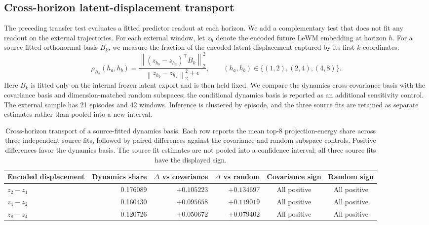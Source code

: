 \documentclass{article}
\begin{document}
\subsection{Cross-horizon latent-displacement transport}
\label{sec:supp-cross-horizon-transport}

The preceding transfer test evaluates a fitted predictor readout at each
horizon. We add a complementary test that does not fit any readout on the
external trajectories. For each external window, let $z_{h}$ denote the
encoded future LeWM embedding at horizon $h$. For a source-fitted orthonormal
basis $B_{k}$, we measure the fraction of the encoded latent displacement
captured by its first $k$ coordinates:
\begin{equation}
\rho_{B_k}(h_a,h_b)=
\frac{\left\lVert (z_{h_b}-z_{h_a})^{\top}B_k\right\rVert_2^2}
{\left\lVert z_{h_b}-z_{h_a}\right\rVert_2^2+\epsilon},
\qquad (h_a,h_b)\in\{(1,2),(2,4),(4,8)\}.
\label{eq:supp-cross-horizon-share}
\end{equation}
Here $B_k$ is fitted only on the internal frozen latent export and is then
held fixed. We compare the dynamics cross-covariance basis with the covariance
basis and dimension-matched random subspaces; the conditional dynamics basis
is reported as an additional sensitivity control. The external sample has 21
episodes and 42 windows. Inference is clustered by episode, and the three
source fits are retained as separate estimates rather than pooled into a new
interval.

\begin{table}[H]
\centering
\scriptsize
\setlength{\tabcolsep}{3pt}
\caption{Cross-horizon transport of a source-fitted dynamics basis. Each row
reports the mean top-$8$ projection-energy share across three independent
source fits, followed by paired differences against the covariance and random
subspace controls. Positive differences favor the dynamics basis. The source
fit estimates are not pooled into a confidence interval; all three source
fits have the displayed sign.}
\label{tab:supp-cross-horizon-transport}
\begin{tabular}{lrrrcc}
\toprule
Encoded displacement & Dynamics share & $\Delta$ vs covariance & $\Delta$ vs random & Covariance sign & Random sign \\
\midrule
$z_{2}-z_{1}$ & 0.176089 & $+0.105223$ & $+0.134697$ & All positive & All positive \\
$z_{4}-z_{2}$ & 0.160430 & $+0.095658$ & $+0.119019$ & All positive & All positive \\
$z_{8}-z_{4}$ & 0.120726 & $+0.050672$ & $+0.079402$ & All positive & All positive \\
\bottomrule
\end{tabular}
\end{table}
\end{document}
